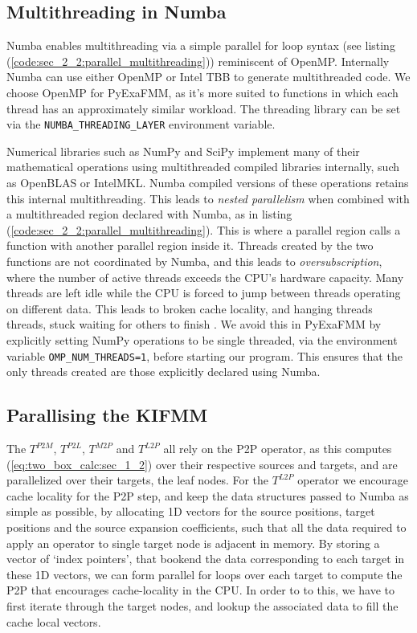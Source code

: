 \subsection*{Multithreading in Numba}

Numba enables multithreading via a simple parallel for loop syntax (see listing (\ref{code:sec_2_2:parallel_multithreading})) reminiscent of OpenMP. Internally Numba can use either OpenMP or Intel TBB to generate multithreaded code. We choose OpenMP for PyExaFMM, as it's more suited to functions in which each thread has an approximately similar workload. The threading library can be set via the \lstinline{NUMBA_THREADING_LAYER} environment variable.

Numerical libraries such as NumPy and SciPy implement many of their mathematical operations using multithreaded compiled libraries internally, such as OpenBLAS or IntelMKL. Numba compiled versions of these operations retains this internal multithreading. This leads to \textit{nested parallelism} when combined with a multithreaded region declared with Numba, as in listing (\ref{code:sec_2_2:parallel_multithreading}). This is where a parallel region calls a function with another parallel region inside it. Threads created by the two functions are not coordinated by Numba, and this leads to \textit{oversubscription}, where the number of active threads exceeds the CPU's hardware capacity. Many threads are left idle while the CPU is forced to jump between threads operating on different data. This leads to broken cache locality, and hanging threads threads, stuck waiting for others to finish \cite{malakhov2016python}. We avoid this in PyExaFMM by explicitly setting NumPy operations to be single threaded, via the environment variable \lstinline{OMP_NUM_THREADS=1}, before starting our program. This ensures that the only threads created are those explicitly declared using Numba.

\subsection*{Parallising the KIFMM}

The $T^{P2M}$, $T^{P2L}$, $T^{M2P}$ and $T^{L2P}$ all rely on the P2P operator, as this computes (\ref{eq:two_box_calc:sec_1_2}) over their respective sources and targets, and are parallelized over their targets, the leaf nodes. For the $T^{L2P}$ operator we encourage cache locality for the P2P step, and keep the data structures passed to Numba as simple as possible, by allocating 1D vectors for the source positions, target positions and the source expansion coefficients, such that all the data required to apply an operator to single target node is adjacent in memory. By storing a vector of `index pointers', that bookend the data corresponding to each target in these 1D vectors, we can form parallel for loops over each target to compute the P2P that encourages cache-locality in the CPU. In order to to this, we have to first iterate through the target nodes, and lookup the associated data to fill the cache local vectors.

